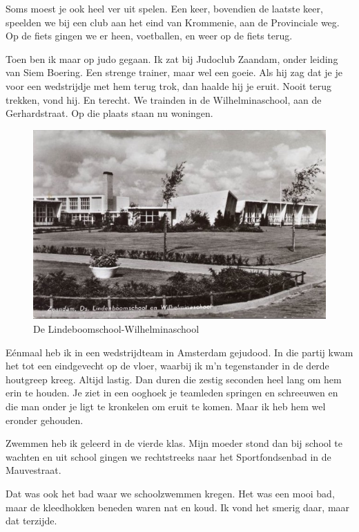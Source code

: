 \documentclass[12pt,twoside, openright]{memoir}
\begin{document}
Soms moest je ook heel ver uit spelen. Een keer, bovendien de laatste keer, speelden we bij een club aan het eind van Krommenie, aan de Provinciale weg. Op de fiets gingen we er heen, voetballen, en weer op de fiets terug. 

Toen ben ik maar op judo gegaan. Ik zat bij Judoclub Zaandam, onder leiding van Siem Boering. Een strenge trainer, maar wel een goeie. Als hij zag dat je je voor een wedstrijdje met hem terug trok, dan haalde hij je eruit. Nooit terug trekken, vond hij. En terecht. We trainden in de Wilhelminaschool, aan de Gerhardstraat. Op die plaats staan nu woningen.

\begin{figure}
\centering
\includegraphics[width=\textwidth]{img/76schooljudo}
\caption*{\footnotesize De Lindeboomschool-Wilhelminaschool }
\end{figure}

Eénmaal heb ik in een wedstrijdteam in Amsterdam gejudood. In die partij kwam het tot een eindgevecht op de vloer, waarbij ik m’n tegenstander in de derde houtgreep kreeg. Altijd lastig. Dan duren die zestig seconden heel lang om hem erin te houden. Je ziet in een ooghoek je teamleden springen en schreeuwen en die man onder je ligt te kronkelen om eruit te komen. Maar ik heb hem wel eronder gehouden. 

Zwemmen heb ik geleerd in de vierde klas. Mijn moeder stond dan bij school te wachten en uit school gingen we rechtstreeks naar het Sportfondsenbad in de Mauvestraat. 

Dat was ook het bad waar we schoolzwemmen kregen. Het was een mooi bad, maar de kleedhokken beneden waren nat en koud. Ik vond het smerig daar, maar dat terzijde. 
\end{document}
